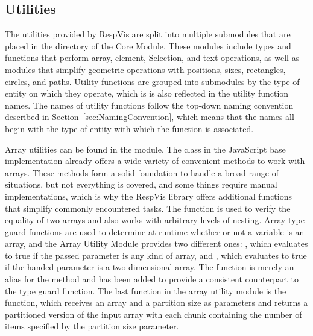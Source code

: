 \subsection{Utilities}

The utilities provided by RespVis are split into multiple submodules that are placed in the  directory of the Core Module.
These modules include types and functions that perform array, element, Selection, and text operations, as well as modules that simplify geometric operations with positions, sizes, rectangles, circles, and paths.
Utility functions are grouped into submodules by the type of entity on which they operate, which is is also reflected in the utility function names.
The names of utility functions follow the top-down naming convention described in Section~\ref{sec:NamingConvention}, which means that the names all begin with the type of entity with which the function is associated.

Array utilities can be found in the  module.
The  class in the JavaScript base implementation already offers a wide variety of convenient methods to work with arrays.
These methods form a solid foundation to handle a broad range of situations, but not everything is covered, and some things require manual implementations, which is why the RespVis library offers additional functions that simplify commonly encountered tasks.
The  function is used to verify the equality of two arrays and also works with arbitrary levels of nesting. 
Array type guard functions are used to determine at runtime whether or not a variable is an array, and the Array Utility Module provides two different ones: , which evaluates to true if the passed parameter is any kind of array, and , which evaluates to true if the handed parameter is a two-dimensional array.
The  function is merely an alias for the  method and has been added to provide a consistent counterpart to the  type guard function.
The last function in the array utility module is the  function, which receives an array and a partition size as parameters and returns a partitioned version of the input array with each chunk containing the number of items specified by the partition size parameter.


